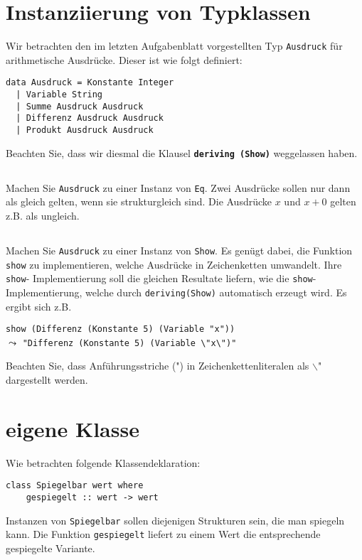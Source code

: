\documentclass[
  10pt,                   %
  DIV12,
  german,                 %
  oneside,                %
  parskip=half,           %
  headings=normal,        %
  captions=tableheading,  %
]{scrartcl}
\begin{document}
\section{Instanziierung von Typklassen}
Wir betrachten den im letzten Aufgabenblatt vorgestellten Typ \lstinline|Ausdruck| für
arithmetische Ausdrücke. Dieser ist wie folgt definiert:
\begin{lstlisting}
data Ausdruck = Konstante Integer
  | Variable String
  | Summe Ausdruck Ausdruck
  | Differenz Ausdruck Ausdruck
  | Produkt Ausdruck Ausdruck
\end{lstlisting}
Beachten Sie, dass wir diesmal die Klausel \textbf{\lstinline|deriving (Show)|} weggelassen haben.
\subsection{}
Machen Sie \lstinline|Ausdruck| zu einer Instanz von \lstinline|Eq|. Zwei Ausdrücke
sollen nur dann als gleich gelten, wenn sie strukturgleich sind. Die Ausdrücke
$x$ und $x + 0$ gelten z.B. als ungleich.
\subsection{}
Machen Sie \lstinline|Ausdruck| zu einer Instanz von \lstinline|Show|. Es genügt dabei, die Funktion \lstinline|show|
zu implementieren, welche Ausdrücke in Zeichenketten umwandelt. Ihre \lstinline|show|-
Implementierung soll die gleichen Resultate liefern, wie die \lstinline|show|-Implementierung,
welche durch \lstinline|deriving(Show)| automatisch erzeugt wird. Es ergibt sich z.B.
\begin{center}
\lstinline|show (Differenz (Konstante 5) (Variable "x"))|\\
$\leadsto$ \lstinline|"Differenz (Konstante 5) (Variable \"x\")"|
\end{center}
Beachten Sie, dass Anführungsstriche (") in Zeichenkettenliteralen als $\backslash$" dargestellt
werden.
\section{eigene Klasse}
Wie betrachten folgende Klassendeklaration:
\begin{lstlisting}
class Spiegelbar wert where
	gespiegelt :: wert -> wert
\end{lstlisting}
Instanzen von \lstinline|Spiegelbar| sollen diejenigen Strukturen sein, die man spiegeln kann. Die
Funktion \lstinline|gespiegelt| liefert zu einem Wert die entsprechende gespiegelte Variante.
\end{document}
